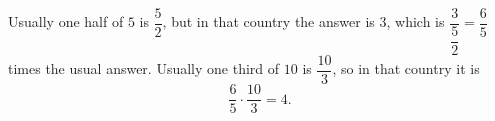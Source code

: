 Usually one half of $5$ is $\dfrac52$, but in that country the answer is $3$, which is $\dfrac{3}{\dfrac52}=\dfrac65$ times the usual answer. Usually one third of $10$ is $\dfrac{10}{3}$, so in that country it is
\[\dfrac65\cdot\dfrac{10}{3}=\boxed{4}.\]
